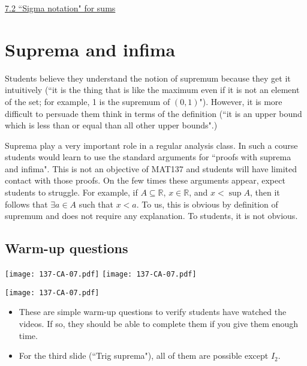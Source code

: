 \documentclass[11pt]{article}
\newcommand{\nl}{\hfill \vspace{-1.1\baselineskip}} %
\newcommand{\vii}{\hspace{8mm} \href{https://www.youtube.com/watch?v=hZXPAEeu5D4&list=PLlwePzQY_wW9vqCkUudCmoOvnNmr9vMuJ&index=2}{7.2 ``Sigma notation" for sums}}
\begin{document}
\begin{videos}
\vii
\end{videos}

\newpage
\section{Suprema and infima}
\vspace{5mm}

Students believe they understand the notion of supremum because they get it intuitively (``it is the thing that is like the maximum even if it is not an element of the set; for example, 1 is the supremum of $(0,1)$").  However, it is more difficult to persuade them think in terms of the definition (``it is an upper bound which is less than or equal than all other upper bounds".)

\vspace{5mm}

Suprema play a very important role in a regular analysis class.  In such a course students would learn to use the standard arguments for ``proofs with suprema and infima".  This is not an objective of MAT137 and students will have limited contact with those proofs.  On the few times these arguments appear, expect students to struggle.  For example, if $A \subseteq \mathbb{R}$, $x \in \mathbb{R}$, and $x < \sup A$, then it follows that $\exists a \in A$ such that $x < a$. To us, this is obvious by definition of supremum and does not require any explanation.  To students, it is not obvious.
\vspace{5mm}
\subsection{Warm-up questions}

\begin{center}
{ \texttt{[image: 137-CA-07.pdf]}} \quad
{ \texttt{[image: 137-CA-07.pdf]}} 

{ \texttt{[image: 137-CA-07.pdf]}} 
\end{center}

\vspace{-2cm}

\begin{comments}
\nl
	\begin{itemize}
		\item  These are simple warm-up questions to verify students have watched the videos.  If so, they should be able to complete them if you give them enough time.
		\item For the third slide (``Trig suprema"), all of them are possible except $I_2$. 
	\end{itemize}
\end{comments}
\end{document}
